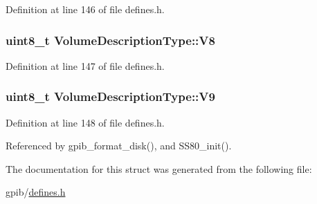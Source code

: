 Definition at line 146 of file defines.\-h.

\hypertarget{structVolumeDescriptionType_a86597a2edf96558d4176afc6ac3a0565}{
\subsubsection[{V8}]{\setlength{\rightskip}{0pt plus 5cm}uint8\-\_\-t Volume\-Description\-Type\-::\-V8}}\label{structVolumeDescriptionType_a86597a2edf96558d4176afc6ac3a0565}


Definition at line 147 of file defines.\-h.

\hypertarget{structVolumeDescriptionType_a8db8489c65036975ec2ebe01734310be}{
\subsubsection[{V9}]{\setlength{\rightskip}{0pt plus 5cm}uint8\-\_\-t Volume\-Description\-Type\-::\-V9}}\label{structVolumeDescriptionType_a8db8489c65036975ec2ebe01734310be}


Definition at line 148 of file defines.\-h.



Referenced by gpib\-\_\-format\-\_\-disk(), and S\-S80\-\_\-init().



The documentation for this struct was generated from the following file\-:\begin{DoxyCompactItemize}
\item 
gpib/\hyperlink{defines_8h}{defines.\-h}\end{DoxyCompactItemize}
